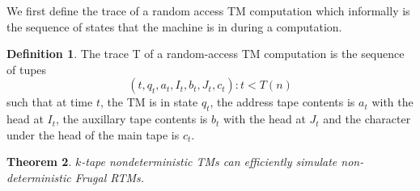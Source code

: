 \documentclass[english]{article}
\theoremstyle{plain}
\newtheorem{thm}{Theorem}
\theoremstyle{definition}
\newtheorem{defn}[thm]{Definition}
\theoremstyle{plain}
\begin{document}
We first define the trace of a random access TM computation which
informally is the sequence of states that the machine is in during a
computation.

\begin{defn}
  The trace T of a random-access TM computation is the sequence of tupes
\[
(t,q_t,a_t,I_t,b_t,J_t,c_t): t < T(n)
\]
  such that at time $t$, the TM is in state $q_t$, the address tape
  contents is $a_t$ with the head at $I_t$, the auxillary tape
  contents is $b_t$ with the head at $J_t$ and the character under the
  head of the main tape is $c_t$.
\end{defn}

\begin{thm}
  $k$-tape nondeterministic TMs can efficiently simulate
  non-deterministic Frugal RTMs.
\end{thm}
\end{document}
